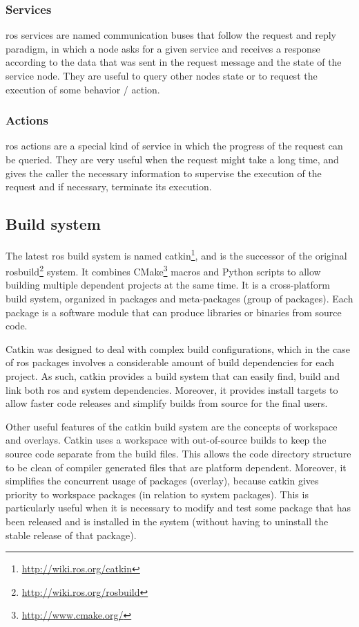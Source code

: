\subsubsection{Services}

\gls{ros} services are named communication buses that follow the request and reply paradigm, in which a node asks for a given service and receives a response according to the data that was sent in the request message and the state of the service node. They are useful to query other nodes state or to request the execution of some behavior / action.


\subsubsection{Actions}

\gls{ros} actions are a special kind of service in which the progress of the request can be queried. They are very useful when the request might take a long time, and gives the caller the necessary information to supervise the execution of the request and if necessary, terminate its execution.


\subsection{Build system}

The latest \gls{ros} build system is named catkin\footnote{\url{http://wiki.ros.org/catkin}}, and is the successor of the original rosbuild\footnote{\url{http://wiki.ros.org/rosbuild}} system. It combines CMake\footnote{\url{http://www.cmake.org/}} macros and Python scripts to allow building multiple dependent projects at the same time. It is a cross-platform build system, organized in packages and meta-packages (group of packages). Each package is a software module that can produce libraries or binaries from source code.

Catkin was designed to deal with complex build configurations, which in the case of \gls{ros} packages involves a considerable amount of build dependencies for each project. As such, catkin provides a build system that can easily find, build and link both \gls{ros} and system dependencies. Moreover, it provides install targets to allow faster code releases and simplify builds from source for the final users.

Other useful features of the catkin build system are the concepts of workspace and overlays. Catkin uses a workspace with out-of-source builds to keep the source code separate from the build files. This allows the code directory structure to be clean of compiler generated files that are platform dependent. Moreover, it simplifies the concurrent usage of packages (overlay), because catkin gives priority to workspace packages (in relation to system packages). This is particularly useful when it is necessary to modify and test some package that has been released and is installed in the system (without having to uninstall the stable release of that package).

